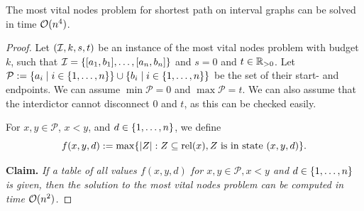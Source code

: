 \begin{theorem}
\label{thm_MVN_shortest_path}
The most vital nodes problem for shortest path on interval graphs  can be solved in time $\mathcal{O}(n^4)$.
\end{theorem}
\begin{proof}
Let $(\mathcal{I}, k, s, t)$ be an instance of the most vital nodes problem with budget $k$, such that $\mathcal{I} = \{ [a_1, b_1], \ldots, [a_n, b_n] \}$ and $s = 0$ and $t \in \mathbb{R}_{> 0}$. Let $\mathcal{P} := \{ a_i \mid i \in \{ 1, \ldots, n \} \} \cup \{ b_i \mid i \in  \{ 1, \ldots, n \} \} 
$ be the set of their start- and endpoints.
We can assume $\min\mathcal{P} = 0$ and $\max\mathcal{P} = t$.
We can also assume that the interdictor cannot disconnect 0 and $t$, as this can be checked easily.

 For $x, y \in \mathcal{P}$, $x < y$, and $d \in \{ 1, \ldots, n \}$, we define
\[f(x,y,d) := \max\{ |Z| : Z \subseteq \operatorname{\text{rel}}(x), Z \text{ is in state } (x,y,d) \}. 
\]

\textbf{Claim.} \emph{If a table of all values $f(x,y,d)$ for $x,y \in \mathcal{P}, x < y$ and $d \in \{ 1, \ldots, n \}$ is given, then the solution to the most vital nodes problem  can be computed in time $\mathcal{O}(n^2)$.}


\end{proof}
